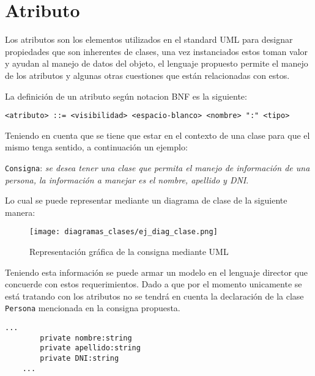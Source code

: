 \section{Atributo}
\label{sec:atributo}

Los atributos son los elementos utilizados en el standard UML para designar
propiedades que son inherentes de clases, una vez instanciados estos toman
valor y ayudan al manejo de datos del objeto, el lenguaje propuesto permite el
manejo de los atributos y algunas otras cuestiones que están relacionadas con
estos.

La definición de un atributo según notacion BNF es la siguiente:

\begin{lstlisting}[basicstyle=\footnotesize\ttfamily]
  <atributo> ::= <visibilidad> <espacio-blanco> <nombre> ":" <tipo>
\end{lstlisting}

Teniendo en cuenta que se tiene que estar en el contexto de una clase para que
el mismo tenga sentido, a continuación un ejemplo:\\

\begin{displayquote}
	\texttt{Consigna}: \textit{se desea tener una clase que permita el manejo de
	información de una persona, la información a manejar es el nombre, apellido
	y DNI}.
\end{displayquote}

Lo cual se puede representar mediante un diagrama de clase
de la siguiente manera:

\begin{figure}[H]
	\centering
	\texttt{[image: diagramas\_clases/ej\_diag\_clase.png]}
	\caption{Representación gráfica de la consigna mediante UML}
	\label{fig:ej_diag_clase.png}
\end{figure}

Teniendo esta información se puede armar un modelo en el lenguaje director que
concuerde con estos requerimientos. Dado a que por el momento unicamente se
está tratando con los atributos no se tendrá en cuenta la declaración de la
clase \texttt{Persona} mencionada en la consigna propuesta.

\begin{lstlisting}[label=frag:atributo]
  ...
		private nombre:string
		private apellido:string
		private DNI:string
	...
\end{lstlisting}

